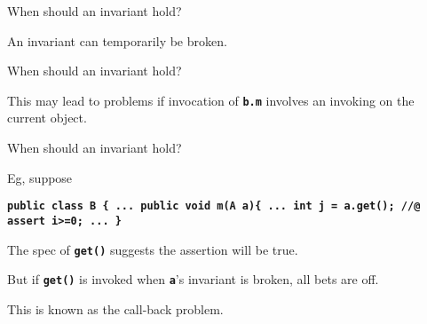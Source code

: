\documentclass[
pdf,
nocolorBG,
slideColor,
erik,
]{prosper}
\newcommand{\code}[1]{{\rm \texttt{\textbf{\small #1}}}}
\newcommand{\result}     {\(\backslash\)result}
\newcommand{\bsl}{\char'134}
\renewcommand{\result}{\bsl result}
\begin{document}
\begin{slide}{When should an invariant hold?}
\vspace*{-4ex}



An invariant can temporarily be broken.

\end{slide}

\begin{slide}{When should an invariant hold?}
\vspace*{-4ex}


This may lead to problems if invocation of \code{b.m}
involves an invoking on the current object.

\end{slide}

\begin{slide}{When should an invariant hold?}
\vspace*{-4ex}

Eg, suppose

\begin{alltt}\code{\scriptsize public class B \{
 ...
   public void m(A a)\{ 
    ... 
    int j = a.get(); //@ assert i>=0;
    ...
   \}}
\end{alltt} %

The spec of \code{get()} suggests the assertion will be true.

\medskip

But if \code{get()} is invoked when \code{a}'s invariant is broken, all bets are off.

\medskip

This is known as the {\red call-back} problem.

\end{slide}
\end{document}
